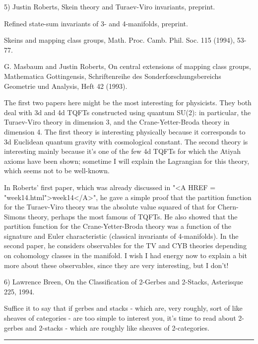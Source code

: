 5) Justin Roberts, Skein theory and Turaev-Viro invariants, preprint.

Refined state-sum invariants of 3- and 4-manifolds, preprint.

Skeins and mapping class groups, Math. Proc. Camb. Phil. Soc. 115 (1994),  
53-77.

G. Masbaum and Justin Roberts, On central extensions of mapping class groups,
Mathematica Gottingensis, Schriftenreihe des Sonderforschungsbereichs Geometrie
und Analysis, Heft 42 (1993).

The first two papers here might be the most interesting for physicists.  
They both deal with 3d and 4d TQFTs constructed using quantum SU(2): 
in particular, the Turaev-Viro theory in dimension 3, and the 
Crane-Yetter-Broda theory in dimension 4.  The first theory is interesting 
physically because it corresponds to 3d Euclidean quantum gravity with 
cosmological constant.  The second theory is interesting mainly because 
it's one of the few 4d TQFTs for which the Atiyah axioms have been shown; 
sometime I will explain the Lagrangian for this theory, which seems not to 
be well-known.   

In Roberts' first paper, which was already discussed in "<A HREF =
"week14.html">week14</A>", he gave a simple proof that the partition
function for the Turaev-Viro theory was the absolute value squared of
that for Chern-Simons theory, perhaps the most famous of TQFTs.  He also
showed that the partition function for the Crane-Yetter-Broda theory was
a function of the signature and Euler characteristic (classical
invariants of 4-manifolds).  In the second paper, he considers
observables for the TV and CYB theories depending on cohomology classes
in the manifold.  I wish I had energy now to explain a bit more about
these observables, since they are very interesting, but I don't!

6) Lawrence Breen, On the Classification of 2-Gerbes and 2-Stacks, 
Asterisque 225, 1994.

Suffice it to say that if gerbes and stacks - which are, very roughly, 
sort of like sheaves of categories - are too simple to interest
you, it's time to read about 2-gerbes and 2-stacks - which are 
roughly like sheaves of 2-categories.  


\par\noindent\rule{\textwidth}{0.4pt}
